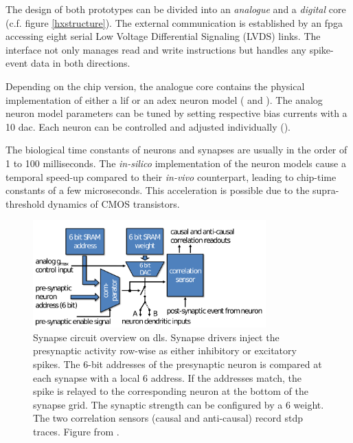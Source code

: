 The design of both prototypes can be divided into an \emph{analogue} and a \emph{digital} core (c.f. figure \ref{hxstructure}). The external communication is established by an \gls{fpga} accessing eight serial Low Voltage Differential Signaling (LVDS) links. The interface not only manages read and write instructions but handles any spike-event data in both directions.

Depending on the chip version, the analogue core contains the physical implementation of either a \gls{lif} or an \gls{adex} neuron model (\citealp{aamir2018dls2neuron} and \citealp{aamir2018mixed}). The analog neuron model parameters can be tuned by setting respective bias currents with a \SI{10}{\bit} \gls{dac}. Each neuron can be controlled and adjusted individually (\citealp{hock13analogmemory}). 

The biological time constants of neurons and synapses are usually in the order of 1 to 100 milliseconds. The \textit{in-silico} implementation of the neuron models cause a temporal speed-up compared to their \textit{in-vivo} counterpart, leading to chip-time constants of a few microseconds. This acceleration is possible due to the supra-threshold dynamics of CMOS transistors. 

\begin{figure}
	\centering
	\includegraphics[width=0.8\textwidth]{figures/synapse.png}
	\caption[Synapse circuit overview on \gls{dls}]{Synapse circuit overview on \gls{dls}. Synapse drivers inject the presynaptic activity row-wise as either inhibitory or excitatory spikes. The 6-bit addresses of the presynaptic neuron is compared at each synapse with a local \SI{6}{\bit} address. If the addresses match, the spike is relayed to the corresponding neuron at the bottom of the synapse grid. The synaptic strength can be configured by a \SI{6}{\bit} weight. The two correlation sensors (causal and anti-causal) record \gls{stdp} traces. Figure from \cite{friedmann2016hybridlearning}.}
	\label{synapseschematics}
\end{figure}

